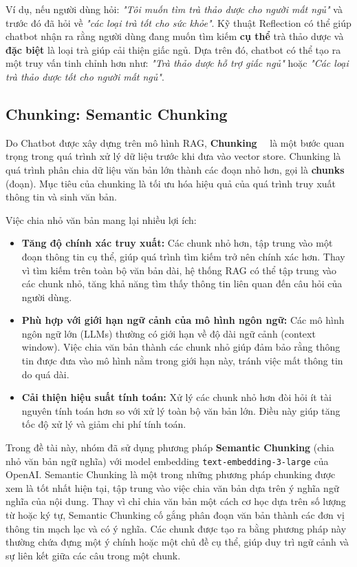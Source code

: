\documentclass{article}
\numberwithin{equation}{section}
\numberwithin{equation}{section}
\begin{document}
Ví dụ, nếu người dùng hỏi: \textit{"Tôi muốn tìm trà thảo dược cho người mất ngủ"} và trước đó đã hỏi về \textit{"các loại trà tốt cho sức khỏe"}. Kỹ thuật Reflection có thể giúp chatbot nhận ra rằng người dùng đang muốn tìm kiếm \textbf{cụ thể} trà thảo dược và \textbf{đặc biệt} là loại trà giúp cải thiện giấc ngủ. Dựa trên đó, chatbot có thể tạo ra một truy vấn tinh chỉnh hơn như: \textit{"Trà thảo dược hỗ trợ giấc ngủ"} hoặc \textit{"Các loại trà thảo dược tốt cho người mất ngủ"}.

\subsection{Chunking: Semantic Chunking}
Do Chatbot được xây dựng trên mô hình RAG, \textbf{Chunking}~\cite{Saxena2023ChunkingRAG}~\cite{Bouchard2023RAGChunking} là một bước quan trọng trong quá trình xử lý dữ liệu trước khi đưa vào vector store. Chunking là quá trình phân chia dữ liệu văn bản lớn thành các đoạn nhỏ hơn, gọi là \textbf{chunks} (đoạn). Mục tiêu của chunking là tối ưu hóa hiệu quả của quá trình truy xuất thông tin và sinh văn bản.

Việc chia nhỏ văn bản mang lại nhiều lợi ích:
\begin{itemize}[-]
    \item \textbf{Tăng độ chính xác truy xuất:} Các chunk nhỏ hơn, tập trung vào một đoạn thông tin cụ thể, giúp quá trình tìm kiếm trở nên chính xác hơn. Thay vì tìm kiếm trên toàn bộ văn bản dài, hệ thống RAG có thể tập trung vào các chunk nhỏ, tăng khả năng tìm thấy thông tin liên quan đến câu hỏi của người dùng.
    \item \textbf{Phù hợp với giới hạn ngữ cảnh của mô hình ngôn ngữ:} Các mô hình ngôn ngữ lớn (LLMs) thường có giới hạn về độ dài ngữ cảnh (context window). Việc chia văn bản thành các chunk nhỏ giúp đảm bảo rằng thông tin được đưa vào mô hình nằm trong giới hạn này, tránh việc mất thông tin do quá dài.
    \item \textbf{Cải thiện hiệu suất tính toán:} Xử lý các chunk nhỏ hơn đòi hỏi ít tài nguyên tính toán hơn so với xử lý toàn bộ văn bản lớn. Điều này giúp tăng tốc độ xử lý và giảm chi phí tính toán.
\end{itemize}

Trong đề tài này, nhóm đã sử dụng phương pháp \textbf{Semantic Chunking} (chia nhỏ văn bản ngữ nghĩa) với model embedding \texttt{text-embedding-3-large} của OpenAI. Semantic Chunking là một trong những phương pháp chunking được xem là tốt nhất hiện tại, tập trung vào việc chia văn bản dựa trên ý nghĩa ngữ nghĩa của nội dung. Thay vì chỉ chia văn bản một cách cơ học dựa trên số lượng từ hoặc ký tự, Semantic Chunking cố gắng phân đoạn văn bản thành các đơn vị thông tin mạch lạc và có ý nghĩa. Các chunk được tạo ra bằng phương pháp này thường chứa đựng một ý chính hoặc một chủ đề cụ thể, giúp duy trì ngữ cảnh và sự liên kết giữa các câu trong một chunk.
\end{document}
